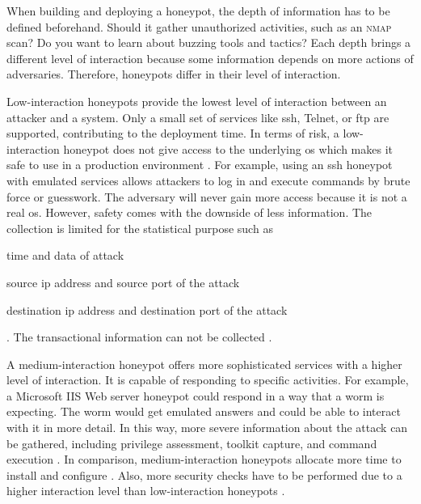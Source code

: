 When building and deploying a honeypot, the depth of information has to be defined beforehand.
Should it gather unauthorized activities, such as an \textsc{nmap} scan?
Do you want to learn about buzzing tools and tactics?
Each depth brings a different level of interaction because some information depends on more actions of adversaries.
Therefore, honeypots differ in their level of interaction.

Low-interaction honeypots provide the lowest level of interaction between an attacker and a system.
Only a small set of services like \ac{ssh}, Telnet, or \ac{ftp} are supported, contributing to the deployment time.
In terms of risk, a low-interaction honeypot does not give access to the underlying \ac{os} which makes it safe to use in a production environment \cite{Spitzner2003}.
For example, using an \ac{ssh} honeypot with emulated services allows attackers to log in and execute commands by brute force or guesswork.
The adversary will never gain more access because it is not a real \ac{os}.
However, safety comes with the downside of less information.
The collection is limited for the statistical purpose such as
\begin{enumerate*}[label=(\roman*)]
    \item time and data of attack
    \item source \ac{ip} address and source port of the attack
    \item destination \ac{ip} address and destination port of the attack
\end{enumerate*} \cite{Spitzner2003,Mokube2007}.
The transactional information can not be collected \cite{Spitzner2003}.

A medium-interaction honeypot offers more sophisticated services with a higher level of interaction.
It is capable of responding to specific activities.
For example, a Microsoft IIS Web server honeypot could respond in a way that a worm is expecting.
The worm would get emulated answers and could be able to interact with it in more detail.
In this way, more severe information about the attack can be gathered, including privilege assessment, toolkit capture, and command execution \citet{Spitzner2003}.
In comparison, medium-interaction honeypots allocate more time to install and configure \cite{Spitzner2003,Mokube2007}.
Also, more security checks have to be performed due to a higher interaction level than low-interaction honeypots \cite{Spitzner2003}.

